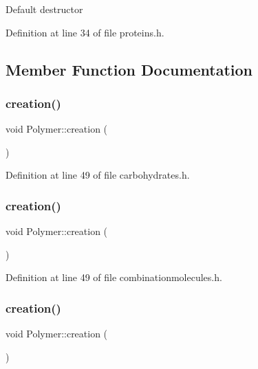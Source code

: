 Default destructor 

Definition at line 34 of file proteins.\+h.



\subsection{Member Function Documentation}
\mbox{\label{class_polymer_a1daba3eb2ba8428bf2f3e814668b155f}} 
\subsubsection{\texorpdfstring{creation()}{creation()}\hspace{0.1cm}{\footnotesize\ttfamily [1/10]}}
{\footnotesize\ttfamily void Polymer\+::creation (\begin{DoxyParamCaption}{ }\end{DoxyParamCaption})\hspace{0.3cm}{\ttfamily [inline]}}



Definition at line 49 of file carbohydrates.\+h.

\mbox{\label{class_polymer_a1daba3eb2ba8428bf2f3e814668b155f}} 
\subsubsection{\texorpdfstring{creation()}{creation()}\hspace{0.1cm}{\footnotesize\ttfamily [2/10]}}
{\footnotesize\ttfamily void Polymer\+::creation (\begin{DoxyParamCaption}{ }\end{DoxyParamCaption})\hspace{0.3cm}{\ttfamily [inline]}}



Definition at line 49 of file combinationmolecules.\+h.

\mbox{\label{class_polymer_a1daba3eb2ba8428bf2f3e814668b155f}} 
\subsubsection{\texorpdfstring{creation()}{creation()}\hspace{0.1cm}{\footnotesize\ttfamily [3/10]}}
{\footnotesize\ttfamily void Polymer\+::creation (\begin{DoxyParamCaption}{ }\end{DoxyParamCaption})\hspace{0.3cm}{\ttfamily [inline]}}



